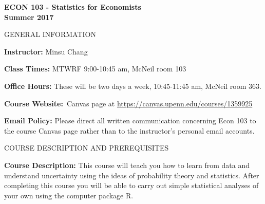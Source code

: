\documentclass[11pt, letterpaper]{article}
\begin{document}
\thispagestyle{plain}

\begin{center}
\Large
\sc
\textbf{ECON 103 - Statistics for Economists}\\
\large
\textbf{Summer 2017}
\end{center}

\normalsize
\bigskip

\begin{center}
\small
GENERAL INFORMATION
\end{center}

\noindent \textbf{Instructor:} Minsu Chang 

\medskip

\noindent \textbf{Class Times:} MTWRF 9:00-10:45 am, McNeil room 103

\medskip


\noindent \textbf{Office Hours:} These will be two days a week, 10:45-11:45 am, McNeil room 363.


\medskip

 
\noindent \textbf{Course Website:\,} Canvas page at \url{https://canvas.upenn.edu/courses/1359925}

\medskip

\noindent \textbf{Email Policy:} Please direct all written communication concerning Econ 103 to the course Canvas page rather than to the instructor's personal email accounts.

\vspace{0.2in}

\begin{center}
\small
COURSE DESCRIPTION AND PREREQUISITES
\end{center}


\noindent \textbf{Course Description:} 
This course will teach you how to learn from data and understand uncertainty using the ideas of probability theory and statistics. 
After completing this course you will be able to carry out simple statistical analyses of your own using the computer package R.


\medskip

\end{document}

